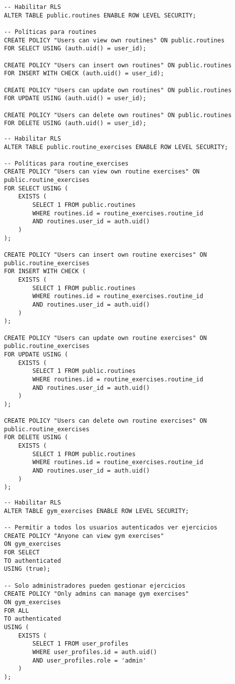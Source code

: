 \documentclass[12pt,a4paper]{article}
\begin{document}
\begin{lstlisting}[style=sqlstyle, caption=Políticas RLS para routines]
-- Habilitar RLS
ALTER TABLE public.routines ENABLE ROW LEVEL SECURITY;

-- Políticas para routines
CREATE POLICY "Users can view own routines" ON public.routines
FOR SELECT USING (auth.uid() = user_id);

CREATE POLICY "Users can insert own routines" ON public.routines
FOR INSERT WITH CHECK (auth.uid() = user_id);

CREATE POLICY "Users can update own routines" ON public.routines
FOR UPDATE USING (auth.uid() = user_id);

CREATE POLICY "Users can delete own routines" ON public.routines
FOR DELETE USING (auth.uid() = user_id);
\end{lstlisting}

\begin{lstlisting}[style=sqlstyle, caption=Políticas RLS para routine_exercises]
-- Habilitar RLS
ALTER TABLE public.routine_exercises ENABLE ROW LEVEL SECURITY;

-- Políticas para routine_exercises
CREATE POLICY "Users can view own routine exercises" ON public.routine_exercises
FOR SELECT USING (
    EXISTS (
        SELECT 1 FROM public.routines 
        WHERE routines.id = routine_exercises.routine_id 
        AND routines.user_id = auth.uid()
    )
);

CREATE POLICY "Users can insert own routine exercises" ON public.routine_exercises
FOR INSERT WITH CHECK (
    EXISTS (
        SELECT 1 FROM public.routines 
        WHERE routines.id = routine_exercises.routine_id 
        AND routines.user_id = auth.uid()
    )
);

CREATE POLICY "Users can update own routine exercises" ON public.routine_exercises
FOR UPDATE USING (
    EXISTS (
        SELECT 1 FROM public.routines 
        WHERE routines.id = routine_exercises.routine_id 
        AND routines.user_id = auth.uid()
    )
);

CREATE POLICY "Users can delete own routine exercises" ON public.routine_exercises
FOR DELETE USING (
    EXISTS (
        SELECT 1 FROM public.routines 
        WHERE routines.id = routine_exercises.routine_id 
        AND routines.user_id = auth.uid()
    )
);
\end{lstlisting}

\begin{lstlisting}[style=sqlstyle, caption=Políticas RLS para gym_exercises]
-- Habilitar RLS
ALTER TABLE gym_exercises ENABLE ROW LEVEL SECURITY;

-- Permitir a todos los usuarios autenticados ver ejercicios
CREATE POLICY "Anyone can view gym exercises"
ON gym_exercises
FOR SELECT
TO authenticated
USING (true);

-- Solo administradores pueden gestionar ejercicios
CREATE POLICY "Only admins can manage gym exercises"
ON gym_exercises
FOR ALL
TO authenticated
USING (
    EXISTS (
        SELECT 1 FROM user_profiles
        WHERE user_profiles.id = auth.uid()
        AND user_profiles.role = 'admin'
    )
);
\end{lstlisting}
\end{document}
